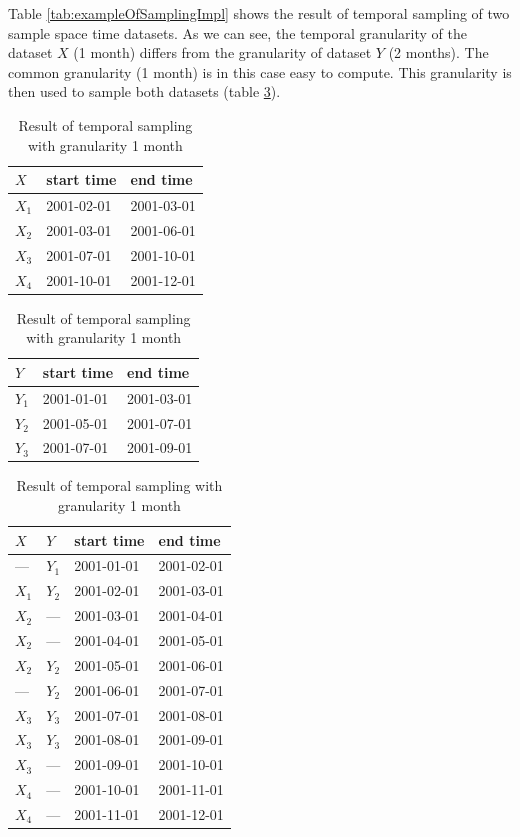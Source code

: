 \documentclass[a4paper,12pt]{book}
\begin{document}
Table \ref{tab:exampleOfSamplingImpl} shows the result of temporal sampling of two sample space time datasets.
As we can see, the temporal granularity of the dataset $X$ (1 month) differs from the granularity of dataset $Y$ (2 months).
The common granularity (1 month) is in this case easy to compute.
This granularity is then used to sample both datasets (table \ref{tab:exampleOfSamplingImpl-2}).


\begin{table}
 \centering
\caption{Example of two space time datasets $X$ and $Y$ and the their sampling by temporal granularity 1 month.}
\label{tab:exampleOfSamplingImpl}
\begin{subtable}{0.4\textwidth}
    \centering
    \caption{List of maps and valid time intervals}
    \begin{tabular}{lll}
    \toprule
    $X$ & start time & end time \\
    \midrule
    $X_1$ & 2001-02-01 & 2001-03-01\\
    $X_2$ & 2001-03-01 & 2001-06-01\\
    $X_3$ & 2001-07-01 & 2001-10-01\\
    $X_4$ & 2001-10-01 & 2001-12-01\\
    \bottomrule
    \end{tabular}

    \vspace{20pt}
    \begin{tabular}{lll}
    \toprule
    $Y$ & start time & end time \\
    \midrule
    $Y_1$ & 2001-01-01 & 2001-03-01\\
    $Y_2$ & 2001-05-01 & 2001-07-01\\
    $Y_3$ & 2001-07-01 & 2001-09-01\\
    \bottomrule
    \end{tabular}
\end{subtable}
\quad
\begin{subtable}{0.4\textwidth}
\centering
\caption{Result of temporal sampling with granularity 1 month}
\label{tab:exampleOfSamplingImpl-2}
\begin{tabular}{llll}
\toprule
 $X$ & $Y$ & start time & end time \\\midrule
--- & $Y_1$ & 2001-01-01 & 2001-02-01\\
$X_1$& $Y_2$ & 2001-02-01 & 2001-03-01\\
$X_2$& --- & 2001-03-01 & 2001-04-01\\
$X_2$& --- & 2001-04-01 & 2001-05-01\\
$X_2$& $Y_2$ & 2001-05-01 & 2001-06-01\\
--- & $Y_2$ & 2001-06-01 & 2001-07-01\\
$X_3$& $Y_3$ & 2001-07-01 & 2001-08-01\\
$X_3$ &$Y_3$ & 2001-08-01 & 2001-09-01\\
$X_3$ & --- & 2001-09-01 & 2001-10-01\\
$X_4$& --- & 2001-10-01 & 2001-11-01\\
$X_4$ & --- & 2001-11-01 & 2001-12-01\\
\bottomrule
\end{tabular}
\end{subtable}


\end{table}
\end{document}
